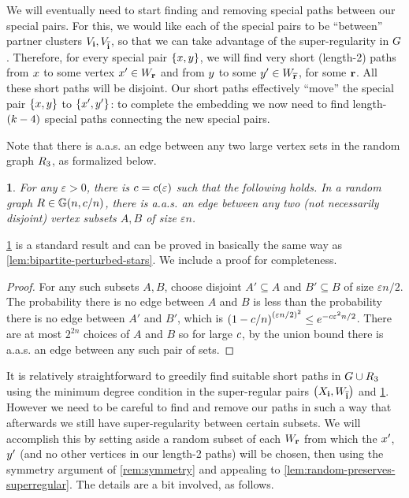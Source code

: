 \documentclass[11pt,english]{article}
\theoremstyle{plain}
\theoremstyle{plain}
\theoremstyle{plain}
\newtheorem{lem}[thm]{\protect\lemmaname}
\theoremstyle{plain}
\theoremstyle{plain}
\theoremstyle{definition}
\theoremstyle{definition}
\theoremstyle{remark}
\theoremstyle{remark}
\theoremstyle{plain}
\theoremstyle{definition}
\theoremstyle{definition}
\theoremstyle{plain}
\theoremstyle{plain}
\theoremstyle{plain}
\newtheorem{mylem}[mythm]{\protect\lemmaname}
\renewenvironment{lem}{\begin{mylem}}{\end{mylem}}
\theoremstyle{plain}
\theoremstyle{remark}
\theoremstyle{plain}
\theoremstyle{definition}
\let\originalleft\left
\let\originalright\right
\renewcommand{\left}{\mathopen{}\mathclose\bgroup\originalleft}
\renewcommand{\right}{\aftergroup\egroup\originalright}
\providecommand{\lemmaname}{Lemma}
\begin{document}
We will eventually need to start finding and removing special paths
between our special pairs. For this, we would like each of the special
pairs to be ``between'' partner clusters $V_{\mathbf{i}},V_{\overline{\mathbf{i}}}$,
so that we can take advantage of the super-regularity in $G$. Therefore,
for every special pair $\left\{ \x,\y\right\} $, we will find very
short (length-2) paths from $x$ to some vertex $x'\in W_{\mathbf{r}}$
and from $y$ to some $y'\in W_{\overline{\mathbf{r}}}$, for some $\mathbf{r}$.
All these short paths will be disjoint. Our short paths effectively
``move'' the special pair $\left\{ \x,\y\right\} $ to $\left\{ \x',\y'\right\} $:
to complete the embedding we now need to find length-$\left(k-4\right)$
special paths connecting the new special pairs.

Note that there is a.a.s. an edge between any two large vertex sets
in the random graph $R_{3}$, as formalized below.
\begin{lem}
\label{lem:edge-between-large-sets}For any $\varepsilon>0$, there
is $\c=\c\left(\varepsilon\right)$ such that the following holds.
In a random graph $\R\in\GG\left(n,\c/n\right)$, there is a.a.s.
an edge between any two (not necessarily disjoint) vertex subsets
$A,B$ of size $\varepsilon n$.
\end{lem}
\ref{lem:edge-between-large-sets} is a standard result and can be
proved in basically the same way as \ref{lem:bipartite-perturbed-stars}.
We include a proof for completeness.
\begin{proof}
For any such subsets $A,B$, choose disjoint $A'\subseteq A$ and
$B'\subseteq B$ of size $\varepsilon n/2$. The probability there
is no edge between $A$ and $B$ is less than the probability there
is no edge between $A'$ and $B'$, which is $\left(1-\c/n\right)^{\left(\varepsilon n/2\right)^{2}}\le e^{-\c\varepsilon^{2}n/2}$.
There are at most $2^{2n}$ choices of $A$ and $B$ so for large
$c$, by the union bound there is a.a.s. an edge between any such
pair of sets.
\end{proof}
It is relatively straightforward to greedily find suitable short paths
in $G\cup R_{3}$ using the minimum degree condition in the super-regular
pairs $\left(X_{\bi},W_{\flip{\bi}}\right)$ and \ref{lem:edge-between-large-sets}.
However we need to be careful to find and remove our paths in such
a way that afterwards we still have super-regularity between certain
subsets. We will accomplish this by setting aside a random subset
of each $W_{\mathbf{r}}$ from which the $x'$, $y'$ (and no other vertices
in our length-2 paths) will be chosen, then using the symmetry argument
of \ref{rem:symmetry} and appealing to \ref{lem:random-preserves-superregular}.
The details are a bit involved, as follows.
\end{document}
